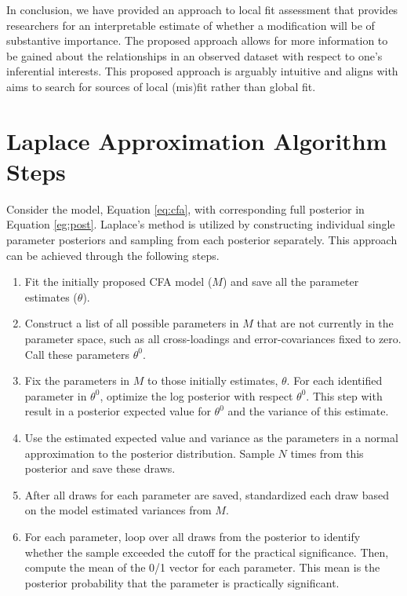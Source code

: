 \documentclass[man, noextraspace, floatsintext, 12pt]{apa7}
\begin{document}
In conclusion, we have provided an approach to local fit assessment that provides researchers for an interpretable estimate of whether a modification will be of substantive importance.
The proposed approach allows for more information to be gained about the relationships in an observed dataset with respect to one's inferential interests.
This proposed approach is arguably intuitive and aligns with aims to search for sources of local (mis)fit rather than global fit.

\newpage
\raggedright
% 
%
\printbibliography
\appendix

\section{Laplace Approximation Algorithm Steps} \label{app:algorithm}
Consider the model, Equation \ref{eq:cfa}, with corresponding full posterior in Equation \ref{eg:post}.
Laplace's method is utilized by constructing individual single parameter posteriors and sampling from each posterior separately.
This approach can be achieved through the following steps.
\begin{enumerate}
\item Fit the initially proposed CFA model ($M$) and save all the parameter estimates ($\theta$).
\item Construct a list of all possible parameters in $M$ that are not currently in the parameter space, such as all cross-loadings and error-covariances fixed to zero. Call these parameters $\theta^0$.
\item Fix the parameters in $M$ to those initially estimates, $\theta$. For each identified parameter in $\theta^0$, optimize the log posterior with respect $\theta^0$. This step with result in a posterior expected value for $\theta^0$ and the variance of this estimate.
\item Use the estimated expected value and variance as the parameters in a normal approximation to the posterior distribution. Sample $N$ times from this posterior and save these draws.
\item After all draws for each parameter are saved, standardized each draw based on the model estimated variances from $M$.
\item For each parameter, loop over all draws from the posterior to identify whether the sample exceeded the cutoff for the practical significance. Then, compute the mean of the 0/1 vector for each parameter. This mean is the posterior probability that the parameter is practically significant.
\end{enumerate}
\end{document}
